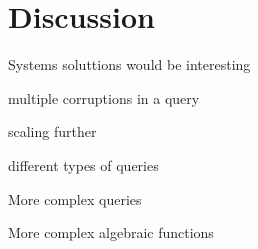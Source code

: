 \section{Discussion}

Systems soluttions would be interesting

multiple corruptions in a query

scaling further

different types of queries

More complex queries

More complex algebraic functions


